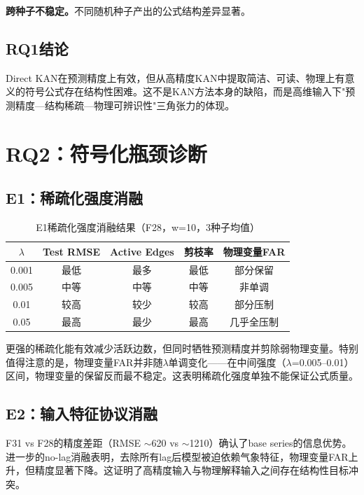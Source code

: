 \documentclass[12pt,a4paper,oneside]{ctexbook}
\begin{document}
\textbf{跨种子不稳定。}不同随机种子产出的公式结构差异显著。

\subsection{RQ1结论}

Direct KAN在预测精度上有效，但从高精度KAN中提取简洁、可读、物理上有意义的符号公式存在结构性困难。这不是KAN方法本身的缺陷，而是高维输入下"预测精度—结构稀疏—物理可辨识性"三角张力的体现。

\section{RQ2：符号化瓶颈诊断}

\subsection{E1：稀疏化强度消融}

\begin{table}[htbp]
\centering
\caption{E1稀疏化强度消融结果（F28，w=10，3种子均值）}
\label{tab:e1-results}
\begin{tabular}{ccccc}
\toprule
$\lambda$ & Test RMSE & Active Edges & 剪枝率 & 物理变量FAR \\
\midrule
0.001 & 最低 & 最多 & 最低 & 部分保留 \\
0.005 & 中等 & 中等 & 中等 & 非单调 \\
0.01 & 较高 & 较少 & 较高 & 部分压制 \\
0.05 & 最高 & 最少 & 最高 & 几乎全压制 \\
\bottomrule
\end{tabular}
\end{table}

更强的稀疏化能有效减少活跃边数，但同时牺牲预测精度并剪除弱物理变量。特别值得注意的是，物理变量FAR并非随$\lambda$单调变化——在中间强度（$\lambda$=0.005--0.01）区间，物理变量的保留反而最不稳定。这表明稀疏化强度单独不能保证公式质量。

\subsection{E2：输入特征协议消融}

F31 vs F28的精度差距（RMSE $\sim$620 vs $\sim$1210）确认了base series的信息优势。进一步的no-lag消融表明，去除所有lag后模型被迫依赖气象特征，物理变量FAR上升，但精度显著下降。这证明了高精度输入与物理解释输入之间存在结构性目标冲突。
\end{document}

